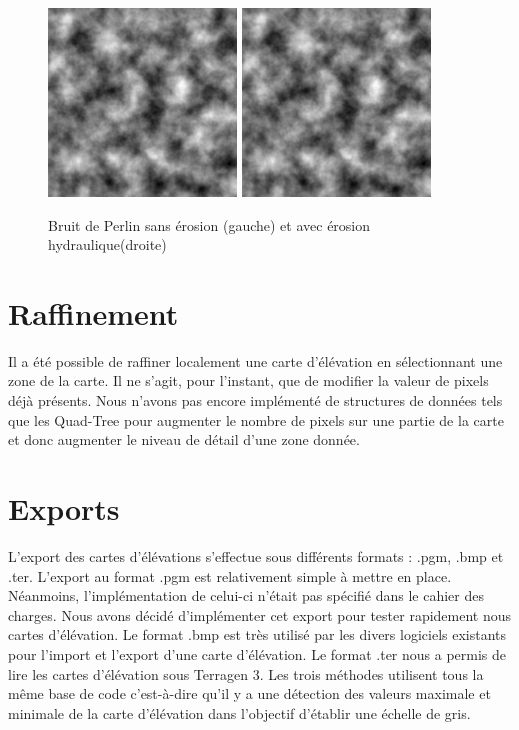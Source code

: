 \begin{figure}[!ht]
  \begin{center}
	\includegraphics[width=5cm]{resources/perlin_ref.png}\hfill
	\includegraphics[width=5cm]{resources/perlin_hydraulicerosion.png}\hfill	
        \caption{Bruit de Perlin sans érosion (gauche) et avec érosion hydraulique(droite)}
        \label{fig:perlin_ref_hydraulic}
   \end{center}
\end{figure}

\section{Raffinement}
Il a été possible de raffiner localement une carte d'élévation en sélectionnant une zone de la carte.
Il ne s'agit, pour l'instant, que de modifier la valeur de pixels déjà présents. 
Nous n'avons pas encore implémenté de structures de données 
tels que les Quad-Tree pour augmenter le nombre de pixels sur une partie de la carte 
et donc augmenter le niveau de détail d'une zone donnée.

\section{Exports}
L'export des cartes d'élévations s'effectue sous différents formats : .pgm, .bmp et .ter.
L'export au format .pgm est relativement simple à mettre en place. 
Néanmoins, l'implémentation de celui-ci n'était pas spécifié dans le cahier des charges. 
Nous avons décidé d'implémenter cet export pour tester rapidement nous cartes d'élévation. 
Le format .bmp est très utilisé par les divers logiciels existants pour 
l'import et l'export d'une carte d'élévation. Le format .ter nous a permis de lire les cartes
d'élévation sous Terragen 3.
Les trois méthodes utilisent tous la même base de code c'est-à-dire qu'il y a une détection des valeurs 
maximale et minimale de la carte d'élévation dans l'objectif d'établir une échelle de gris.

